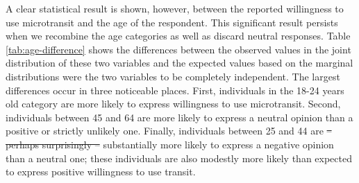 \documentclass[smartcities,article,submit,moreauthors,pdftex]{mdpi} %
\providecommand{\DIFadd}[1]{{\protect\color{blue}\uwave{#1}}} %
\providecommand{\DIFdel}[1]{{\protect\color{red}\sout{#1}}}                      %
\providecommand{\DIFaddbegin}{} %
\providecommand{\DIFaddend}{} %
\providecommand{\DIFdelbegin}{} %
\providecommand{\DIFdelend}{} %
\begin{document}
A clear statistical result is shown, however, between the reported willingness
to use microtransit and the age of the respondent. This significant result
persists when we recombine the age categories as well as discard neutral
responses. Table \ref{tab:age-difference} shows the differences between the
observed values in the joint distribution of these two variables and the
expected values based on the marginal distributions were the two variables to be
completely independent. The largest differences occur in three noticeable
places. First, individuals in the 18-24 years old category are more likely to
express willingness to use microtransit. Second, individuals between 45 and 64
are more likely to express a neutral opinion than a positive or strictly
unlikely one. Finally, individuals between 25 and 44 are \DIFdelbegin \DIFdel{– perhaps surprisingly
– }\DIFdelend \DIFaddbegin \DIFadd{-- perhaps surprisingly
-- }\DIFaddend substantially more likely to express a negative opinion than a neutral one;
these individuals are also modestly more likely than expected to express
positive willingness to use transit.
\end{document}
